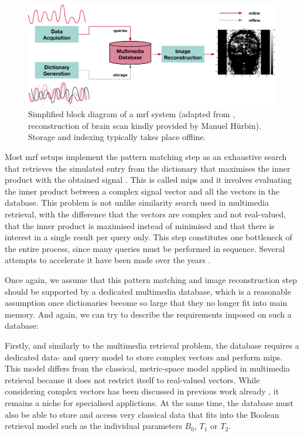 \begin{figure}[tb]
    \centering
    \includegraphics[width=\textwidth]{figures/mrf.eps}
    \caption{Simplified block diagram of a \acrshort{mrf} system (adapted from \cite{Bipin:2019Magnetic}, reconstruction of brain scan kindly provided by Manuel Hürbin). Storage and indexing typically takes place offline.}
    \label{figure:mrf}
\end{figure}

Most \acrshort{mrf} setups implement the pattern matching step as an exhaustive search that retrieves the simulated entry from the dictionary that maximises the inner product with the obtained signal \cite{Bipin:2019Magnetic}. This is called \acrfull{mips} and it involves evaluating the inner product between a complex signal vector and all the vectors in the database. This problem is not unlike similarity search used in multimedia retrieval, with the difference that the vectors are complex and not real-valued, that the inner product is maximised instead of minimised and that there is interest in a single result per query only. This step constitutes one bottleneck of the entire process, since many queries must be performed in sequence. Several attempts to accelerate it have been made over the years \cite{Mcgivney:2014SVD,Cauley:2015Fast,Cohen:2018MR}.

Once again, we assume that this pattern matching and image reconstruction step should be supported by a dedicated multimedia database, which is a reasonable assumption once dictionaries become so large that they no longer fit into main memory. And again, we can try to describe the requirements imposed on such a database: 

Firstly, and similarly to the multimedia retrieval problem, the database requires a dedicated data- and query model to store complex vectors and perform \acrshort{mips}. This model differs from the classical, metric-space model applied in multimedia retrieval because it does not restrict itself to real-valued vectors. While considering complex vectors has been discussed in previous work already \cite{Rafiei:1997Similarity}, it remains a niche for specialised applictions. At the same time, the database must also be able to store and access very classical data that fits into the Boolean retrieval model such as the individual parameters $B_0$, $T_1$ or $T_2$. 

